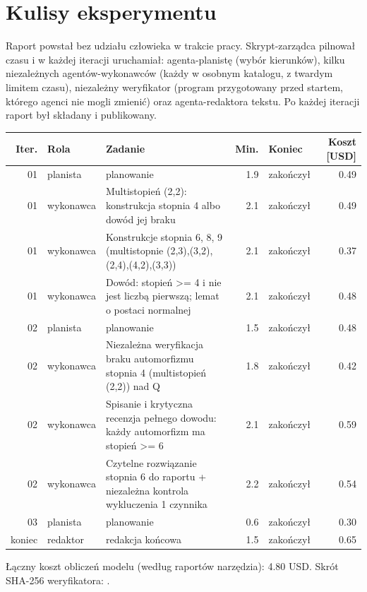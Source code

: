 \section{Kulisy eksperymentu}
Raport powstał bez udziału człowieka w trakcie pracy. Skrypt-zarządca pilnował czasu i w każdej iteracji uruchamiał: agenta-planistę (wybór kierunków), kilku niezależnych agentów-wykonawców (każdy w osobnym katalogu, z twardym limitem czasu), niezależny weryfikator (program przygotowany przed startem, którego agenci nie mogli zmienić) oraz agenta-redaktora tekstu. Po każdej iteracji raport był składany i publikowany.

\begin{center}\small\begin{longtable}{rlp{6.2cm}rlr}\toprule Iter. & Rola & Zadanie & Min. & Koniec & Koszt [USD]\\\midrule\endhead
01 & planista & planowanie  & 1.9 & zakończył & 0.49\\
01 & wykonawca & Multistopień (2,2): konstrukcja stopnia 4 albo dowód jej braku  & 2.1 & zakończył & 0.49\\
01 & wykonawca & Konstrukcje stopnia 6, 8, 9 (multistopnie (2,3),(3,2),(2,4),(4,2),(3,3))  & 2.1 & zakończył & 0.37\\
01 & wykonawca & Dowód: stopień >= 4 i nie jest liczbą pierwszą; lemat o postaci normalnej  & 2.1 & zakończył & 0.48\\
02 & planista & planowanie  & 1.5 & zakończył & 0.48\\
02 & wykonawca & Niezależna weryfikacja braku automorfizmu stopnia 4 (multistopień (2,2)) nad Q  & 1.8 & zakończył & 0.42\\
02 & wykonawca & Spisanie i krytyczna recenzja pełnego dowodu: każdy automorfizm ma stopień >= 6  & 2.1 & zakończył & 0.59\\
02 & wykonawca & Czytelne rozwiązanie stopnia 6 do raportu + niezależna kontrola wykluczenia 1 czynnika  & 2.2 & zakończył & 0.54\\
03 & planista & planowanie  & 0.6 & zakończył & 0.30\\
koniec & redaktor & redakcja końcowa  & 1.5 & zakończył & 0.65\\
\bottomrule\end{longtable}\end{center}
Łączny koszt obliczeń modelu (według raportów narzędzia): 4.80 USD. Skrót SHA-256 weryfikatora: \texttt{\hashWeryfikatora}.
